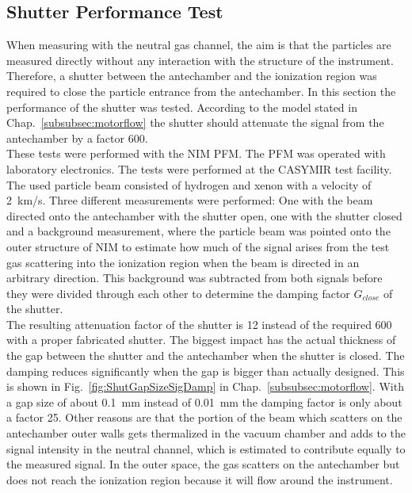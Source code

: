 	\subsection{Shutter Performance Test }\label{chap:expShutter}
	When measuring with the neutral gas channel, the aim is that the particles are measured directly without any interaction with the structure of the instrument. Therefore, a shutter between the antechamber and the ionization region was required to close the particle entrance from the antechamber. In this section the performance of the shutter was tested. According to the model stated in Chap.~\ref{subsubsec:motorflow} the shutter should attenuate the signal from the antechamber by a factor 600.\\
	These tests were performed with the NIM PFM. The PFM was operated with laboratory electronics. The tests were performed at the CASYMIR test facility. The used particle beam consisted of hydrogen and xenon with a velocity of 2~km/s. Three different measurements were performed: One with the beam directed onto the antechamber with the shutter open, one with the shutter closed and a background measurement, where the particle beam was pointed onto the outer structure of NIM to estimate how much of the signal arises from the test gas scattering into the ionization region when the beam is directed in an arbitrary direction. This background was subtracted from both signals before they were divided through each other to determine the damping factor $G_{close}$ of the shutter.\\
	The resulting attenuation factor of the shutter is 12 instead of the required 600 with a proper fabricated shutter. The biggest impact has the actual thickness of the gap between the shutter and the antechamber when the shutter is closed. The damping reduces significantly when the gap is bigger than actually designed. This is shown in Fig.~\ref{fig:ShutGapSizeSigDamp} in Chap.~\ref{subsubsec:motorflow}. With a gap size of about 0.1~mm instead of 0.01~mm the damping factor is only about a factor 25. Other reasons are that the portion of the beam which scatters on the antechamber outer walls gets thermalized in the vacuum chamber and adds to the signal intensity in the neutral channel, which is estimated to contribute equally to the measured signal. In the outer space, the gas scatters on the antechamber but does not reach the ionization region because it will flow around the instrument.
	
